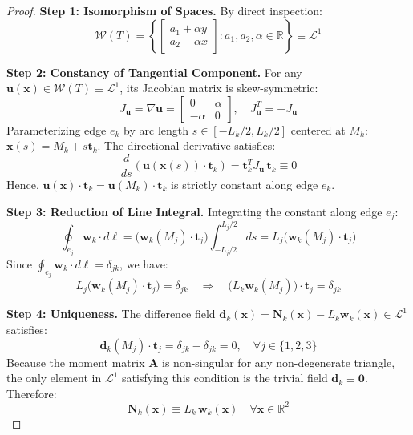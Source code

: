 \documentclass[11pt,a4paper]{article}
\begin{document}
\begin{proof}
\textbf{Step 1: Isomorphism of Spaces.} By direct inspection:
\begin{equation}
    \mathcal{W}(T) = \left\{ \begin{bmatrix} a_1 + \alpha y \\ a_2 - \alpha x \end{bmatrix} : a_1, a_2, \alpha \in \mathbb{R} \right\} \equiv \mathcal{L}^1
\end{equation}

\textbf{Step 2: Constancy of Tangential Component.} For any $\mathbf{u}(\mathbf{x}) \in \mathcal{W}(T) \equiv \mathcal{L}^1$, its Jacobian matrix is skew-symmetric:
\begin{equation}
    J_{\mathbf{u}} = \nabla \mathbf{u} = \begin{bmatrix} 0 & \alpha \\ -\alpha & 0 \end{bmatrix}, \quad J_{\mathbf{u}}^T = -J_{\mathbf{u}}
\end{equation}
Parameterizing edge $e_k$ by arc length $s \in [-L_k/2, L_k/2]$ centered at $M_k$: $\mathbf{x}(s) = M_k + s \mathbf{t}_k$. The directional derivative satisfies:
\begin{equation}
    \frac{d}{ds} (\mathbf{u}(\mathbf{x}(s)) \cdot \mathbf{t}_k) = \mathbf{t}_k^T J_{\mathbf{u}} \, \mathbf{t}_k \equiv 0
\end{equation}
Hence, $\mathbf{u}(\mathbf{x}) \cdot \mathbf{t}_k = \mathbf{u}(M_k) \cdot \mathbf{t}_k$ is strictly constant along edge $e_k$.

\textbf{Step 3: Reduction of Line Integral.} Integrating the constant along edge $e_j$:
\begin{equation}
    \oint_{e_j} \mathbf{w}_k \cdot d\boldsymbol{\ell} = \Big( \mathbf{w}_k(M_j) \cdot \mathbf{t}_j \Big) \int_{-L_j/2}^{L_j/2} ds = L_j \Big( \mathbf{w}_k(M_j) \cdot \mathbf{t}_j \Big)
\end{equation}
Since $\oint_{e_j} \mathbf{w}_k \cdot d\boldsymbol{\ell} = \delta_{jk}$, we have:
\begin{equation}
    L_j \Big( \mathbf{w}_k(M_j) \cdot \mathbf{t}_j \Big) = \delta_{jk} \quad \Longrightarrow \quad \Big( L_k \mathbf{w}_k(M_j) \Big) \cdot \mathbf{t}_j = \delta_{jk}
\end{equation}

\textbf{Step 4: Uniqueness.} The difference field $\mathbf{d}_k(\mathbf{x}) = \mathbf{N}_k(\mathbf{x}) - L_k \mathbf{w}_k(\mathbf{x}) \in \mathcal{L}^1$ satisfies:
\begin{equation}
    \mathbf{d}_k(M_j) \cdot \mathbf{t}_j = \delta_{jk} - \delta_{jk} = 0, \quad \forall j \in \{1, 2, 3\}
\end{equation}
Because the moment matrix $\mathbf{A}$ is non-singular for any non-degenerate triangle, the only element in $\mathcal{L}^1$ satisfying this condition is the trivial field $\mathbf{d}_k \equiv \mathbf{0}$. Therefore:
\begin{equation}
    \mathbf{N}_k(\mathbf{x}) \equiv L_k \, \mathbf{w}_k(\mathbf{x}) \quad \forall \mathbf{x} \in \mathbb{R}^2
\end{equation}


\end{proof}
\end{document}
